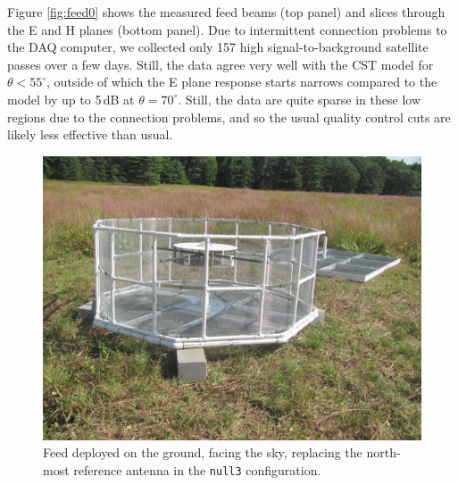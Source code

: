 \documentclass{emulateapj}
\begin{document}
Figure \ref{fig:feed0} shows the measured feed beams (top panel) and slices through the E and H planes (bottom panel). Due to intermittent connection problems to the DAQ computer, we collected only 157 high signal-to-background satellite passes over a few days. Still, the data agree very well with the CST model for $\theta<55^\circ$, outside of which the E plane response starts narrows compared to the model by up to 5\,dB at $\theta=70^\circ$. Still, the data are quite sparse in these low regions due to the connection problems, and so the usual quality control cuts are likely less effective than usual. 

\begin{figure}[h]
\includegraphics[width=5in]{feed.jpg}
\caption{Feed deployed on the ground, facing the sky, replacing the north-most reference antenna in the \texttt{null3} configuration. }
\label{fig:feedpic}
\end{figure}
\end{document}
